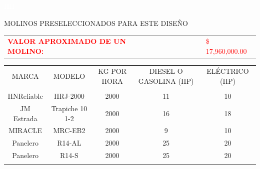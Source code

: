 \documentclass{article}%
\begin{document}
%
\newpage%
\textcolor{white}{ 
HH
}%
\newpage%
\begin{center}%
\begin{Huge}%
MOLINOS PRESELECCIONADOS PARA ESTE DISEÑO%
\end{Huge}%
\linebreak%
\end{center}%
\begin{tabular}{lcccccl}%
\textcolor{red}{ 
\textbf{VALOR APROXIMADO DE UN MOLINO: }
}& & & & & &\textcolor{red}{ 
\$ 17,960,000.00
}\\%
\end{tabular}%
\linebreak%
\begin{tabular}{ccccc}%
MARCA&MODELO&KG POR HORA&DIESEL O GASOLINA (HP)&ELÉCTRICO (HP)\\%
&&&&\\%
HNReliable&HRJ{-}2000&2000&11&10\\%
JM Estrada&Trapiche 10 1{-}2&2000&16&18\\%
MIRACLE&MRC{-}EB2&2000&9&10\\%
Panelero&R14{-}AL&2000&25&20\\%
Panelero&R14{-}S&2000&25&20\\%
\linebreak%
\newline%
%
\linebreak%
\end{tabular}%
\end{document}
